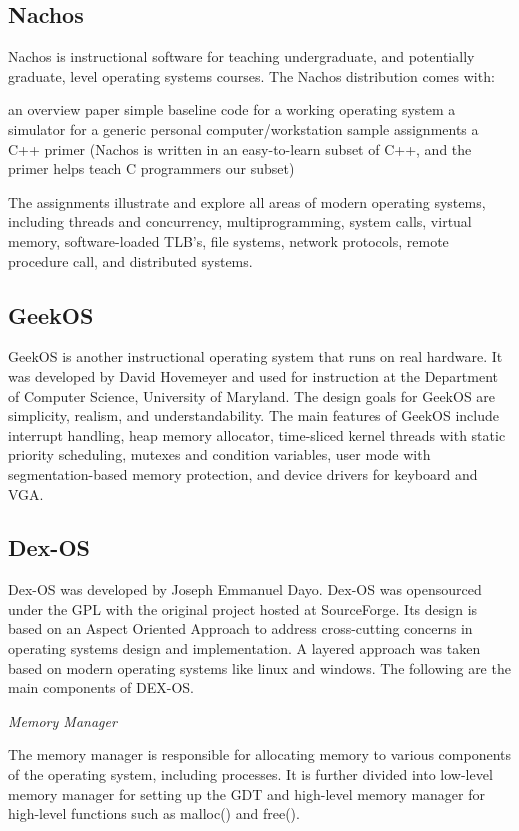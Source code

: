 \documentclass{acm_proc_article-sp}
\begin{document}
\subsection{Nachos}
Nachos is instructional software for teaching undergraduate, and potentially
graduate, level operating systems courses. The Nachos distribution
comes with: 

   an overview paper
   simple baseline code for a working operating system
   a simulator for a generic personal computer/workstation
   sample assignments
   a C++ primer (Nachos is written in an easy-to-learn subset of C++, 
     and the primer helps teach C programmers our subset)

The assignments illustrate and explore all areas of modern operating
systems, including threads and concurrency, multiprogramming, 
system calls, virtual memory, software-loaded TLB's, file systems, 
network protocols, remote procedure call, and distributed systems.


\subsection{GeekOS}

GeekOS is another instructional operating system that runs on real hardware. 
It was developed by David Hovemeyer and used for instruction at the Department 
of Computer Science, University of Maryland. The design goals for GeekOS are
simplicity, realism, and understandability. The main features of GeekOS include interrupt handling, heap memory allocator, time-sliced kernel threads with 
static priority scheduling, mutexes and condition variables, user mode 
with segmentation-based memory protection, and device drivers for keyboard 
and VGA.


\subsection{Dex-OS}
Dex-OS was developed by Joseph Emmanuel Dayo. Dex-OS was opensourced under 
the GPL with the original project hosted at SourceForge. Its design is based on
an Aspect Oriented Approach to address cross-cutting concerns in operating 
systems design and implementation. A layered approach was taken based on 
modern operating systems like linux and windows. The following are the main
components of DEX-OS.

\textit{Memory Manager}

The memory manager is responsible for allocating memory to various components
of the operating system, including processes. It is further divided into 
low-level memory manager for setting up the GDT and high-level memory manager
for high-level functions such as malloc() and free().
\end{document}
